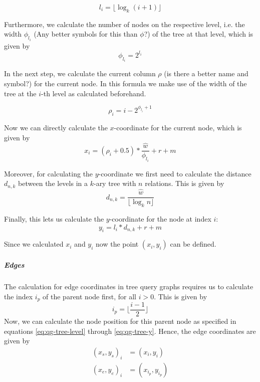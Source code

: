 \begin{equation}
    \label{eq:qg-tree-level}
    l_i = \lfloor \log_{k}(i+1)\rfloor
\end{equation}

Furthermore, we calculate the number of nodes on the respective level, i.e. the width $\phi_{l_i}$ (Any better symbols for this than $\phi$?) of the tree at that level, which is given by
\begin{equation}
    \phi_{l_i} = 2^{l_i}
\end{equation}

In the next step, we calculate the current column $\rho$ (is there a better name and symbol?) for the current node. In this formula we make use of the width of the tree at the $i$-th level as calculated beforehand.

\begin{equation}
    \rho_{i} = i - 2^{\phi_{l_i} + 1}
\end{equation}

Now we can directly calculate the $x$-coordinate for the current node, which is given by
\begin{equation}
    x_i = (\rho_{i} + 0.5) * \frac{\hat{w}}{\phi_{l_i}} + r + m
\end{equation}

Moreover, for calculating the $y$-coordinate we first need to calculate the distance $d_{n,k}$ between the levels in a $k$-ary tree with $n$ relations. This is given by
\begin{equation}
    d_{n,k} = \frac{\hat{w}}{\lfloor \log_k{n} \rfloor}
\end{equation}

Finally, this lets us calculate the $y$-coordinate for the node at index $i$:
\begin{equation}
    \label{eq:qg-tree-y}
    y_i = l_i * d_{n,k} + r + m
\end{equation}

Since we calculated $x_i$ and $y_i$ now the point $(x_i, y_i)$ can be defined.

\subparagraph{Edges}
The calculation for edge coordinates in tree query graphs requires us to calculate the index $i_p$ of the parent node first, for all $i > 0$. This is given by 
\begin{equation}
    i_p = \lfloor \frac{i-1}{2} \rfloor
\end{equation}
Now, we can calculate the node position for this parent node as specified in equations \ref{eq:qg-tree-level} through \ref{eq:qg-tree-y}. Hence, the edge coordinates are given by 
\begin{equation}
    \begin{aligned}
        (x_s, y_s)_i &= (x_i, y_i)\\   
        (x_e, y_e)_i &= (x_{i_p}, y_{i_p})
    \end{aligned}
\end{equation}

